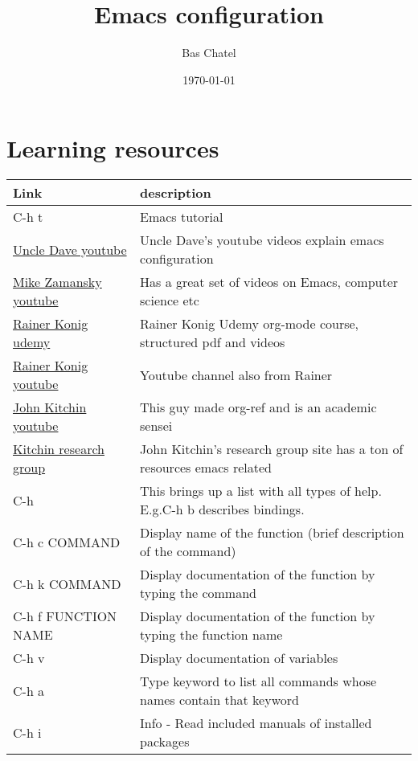 \documentclass[11pt]{article}
\author{Bas Chatel}
\date{\today}
\title{Emacs configuration}
\begin{document}
\maketitle
\tableofcontents

\section{Learning resources}
\label{sec:org3eca0b1}
\begin{center}
\begin{tabular}{ll}
\hline
Link & description\\
\hline
C-h t & Emacs tutorial\\
\href{https://www.youtube.com/channel/UCDEtZ7AKmwS0\_GNJog01D2g}{Uncle Dave youtube} & Uncle Dave's youtube videos explain emacs configuration\\
\href{https://www.youtube.com/channel/UCxkMDXQ5qzYOgXPRnOBrp1w}{Mike Zamansky youtube} & Has a great set of videos on Emacs, computer science etc\\
\href{https://www.udemy.com/course/getting-yourself-organized-with-org-mode/}{Rainer Konig udemy} & Rainer Konig Udemy org-mode course, structured pdf and videos\\
\href{https://www.youtube.com/channel/UCfbGTpcJyEOMwKP-eYz3\_fg}{Rainer Konig youtube} & Youtube channel also from Rainer\\
\href{https://www.youtube.com/channel/UCQp2VLAOlvq142YN3JO3y8w}{John Kitchin youtube} & This guy made org-ref and is an academic sensei\\
\href{http://kitchingroup.cheme.cmu.edu/blog/category/emacs/1/}{Kitchin research group} & John Kitchin's research group site has a ton of resources emacs related\\
C-h & This brings up a list with all types of help. E.g.C-h b describes bindings.\\
C-h c COMMAND & Display name of the function (brief description of the command)\\
C-h k COMMAND & Display documentation of the function by typing the command\\
C-h f FUNCTION NAME & Display documentation of the function by typing the function name\\
C-h v & Display documentation of variables\\
C-h a & Type keyword to list all commands whose names contain that keyword\\
C-h i & Info - Read included manuals of installed packages\\
\hline
\end{tabular}
\end{center}
\end{document}
